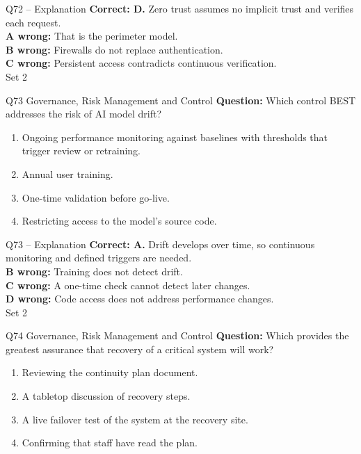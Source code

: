 \documentclass[aspectratio=169,10pt]{beamer}
\begin{document}
\begin{frame}[t]{Q72 -- Explanation}
	\footnotesize
	\textbf{Correct: D.} Zero trust assumes no implicit trust and verifies each request. \\[5pt]
\textbf{A wrong:} That is the perimeter model. \\[3pt]
\textbf{B wrong:} Firewalls do not replace authentication. \\[3pt]
\textbf{C wrong:} Persistent access contradicts continuous verification. \\[3pt]
	\vfill {\tiny Set 2}
\end{frame}

\begin{frame}[t]{Q73 \hfill {\scriptsize Governance, Risk Management and Control}}
	\small
	\textbf{Question:} Which control BEST addresses the risk of AI model drift?
	\begin{enumerate}[label=\Alph*.,itemsep=1pt,topsep=3pt]
			\item Ongoing performance monitoring against baselines with thresholds that trigger review or retraining.
			\item Annual user training.
			\item One-time validation before go-live.
			\item Restricting access to the model's source code.
	\end{enumerate}
\end{frame}

\begin{frame}[t]{Q73 -- Explanation}
	\footnotesize
	\textbf{Correct: A.} Drift develops over time, so continuous monitoring and defined triggers are needed. \\[5pt]
\textbf{B wrong:} Training does not detect drift. \\[3pt]
\textbf{C wrong:} A one-time check cannot detect later changes. \\[3pt]
\textbf{D wrong:} Code access does not address performance changes. \\[3pt]
	\vfill {\tiny Set 2}
\end{frame}

\begin{frame}[t]{Q74 \hfill {\scriptsize Governance, Risk Management and Control}}
	\small
	\textbf{Question:} Which provides the greatest assurance that recovery of a critical system will work?
	\begin{enumerate}[label=\Alph*.,itemsep=1pt,topsep=3pt]
			\item Reviewing the continuity plan document.
			\item A tabletop discussion of recovery steps.
			\item A live failover test of the system at the recovery site.
			\item Confirming that staff have read the plan.
	\end{enumerate}
\end{frame}
\end{document}
